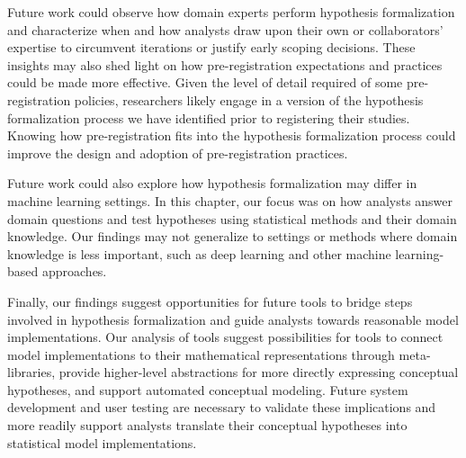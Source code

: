 Future work could observe how domain experts perform hypothesis formalization
and characterize when and how analysts draw upon their own or collaborators'
expertise to circumvent iterations or justify early scoping decisions. These insights may also shed light on how pre-registration expectations and
practices could be made more effective. Given the level of detail required of
some pre-registration policies, researchers likely engage in a version of the
hypothesis formalization process we have identified prior to registering their
studies. Knowing how pre-registration fits into the hypothesis formalization
process could improve the design and adoption of pre-registration practices.

Future work could also explore how hypothesis formalization may differ in
machine learning settings. In this chapter, our focus was on how analysts answer
domain questions and test hypotheses using statistical methods and their domain
knowledge. Our findings may not generalize to settings or methods where domain
knowledge is less important, such as deep learning and other machine
learning-based approaches. 


Finally, our findings suggest opportunities for future tools to bridge steps
involved in hypothesis formalization and guide analysts towards reasonable model
implementations. Our analysis of tools suggest possibilities for tools to
connect model implementations to their mathematical representations through
meta-libraries, provide higher-level abstractions for more directly expressing
conceptual hypotheses, and support automated conceptual modeling. Future system
development and user testing are necessary to validate these implications and
more readily support analysts translate their conceptual hypotheses into
statistical model implementations.





